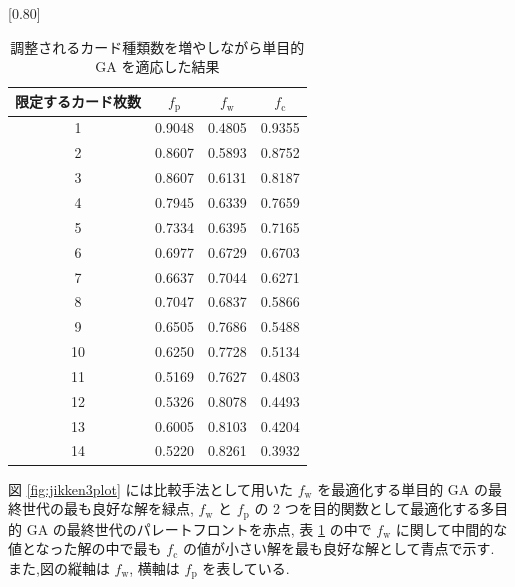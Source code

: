 \documentclass[12pt]{jarticle}
\begin{document}
\begin{table}[t]
  \centering
  \caption{調整されるカード種類数を増やしながら単目的 GA を適応した結果}
  \label{jikken3result}
  \scalebox{0.80}[0.80]{
    \begin{tabular}{|c|c|c|c|}
      \hline
      限定するカード枚数     & $f_\mathrm{p}$ & $f_\mathrm{w}$ & $f_\mathrm{c}$\\ \hline \hline
      1              & 0.9048         & 0.4805 & 0.9355  \\ \hline
      2           & 0.8607         & 0.5893 & 0.8752 \\ \hline
      3        & 0.8607         & 0.6131 & 0.8187  \\ \hline
      4    & 0.7945         & 0.6339 & 0.7659 \\ \hline
      5 & 0.7334         & 0.6395  & 0.7165 \\ \hline
      6 & 0.6977      & 0.6729  & 0.6703 \\ \hline
      7& 0.6637   & 0.7044  & 0.6271 \\ \hline
      8 & 0.7047 & 0.6837 & 0.5866 \\ \hline
      9 & 0.6505 & 0.7686 & 0.5488\\ \hline
      10 & 0.6250 & 0.7728  & 0.5134\\ \hline
      11 & 0.5169 & 0.7627 & 0.4803\\ \hline
      12 & 0.5326 & 0.8078 & 0.4493\\ \hline
      13 & 0.6005 & 0.8103 & 0.4204\\ \hline
      14 &  0.5220 &  0.8261 & 0.3932\\ \hline
      \end{tabular}
  }
  
  \end{table}
図 \ref{fig:jikken3plot} には比較手法として用いた $f_\mathrm{w}$ を最適化する単目的 GA の最終世代の最も良好な解を緑点, $f_\mathrm{w}$ と $f_\mathrm{p}$ の 2 つを目的関数として最適化する多目的 GA の最終世代のパレートフロントを赤点, 表 \ref{jikken3result} の中で $f_\mathrm{w}$ に関して中間的な値となった解の中で最も $f_\mathrm{c}$ の値が小さい解を最も良好な解として青点で示す. 
また,図の縦軸は $f_\mathrm{w}$, 横軸は $f_\mathrm{p}$ を表している. 
\end{document}
